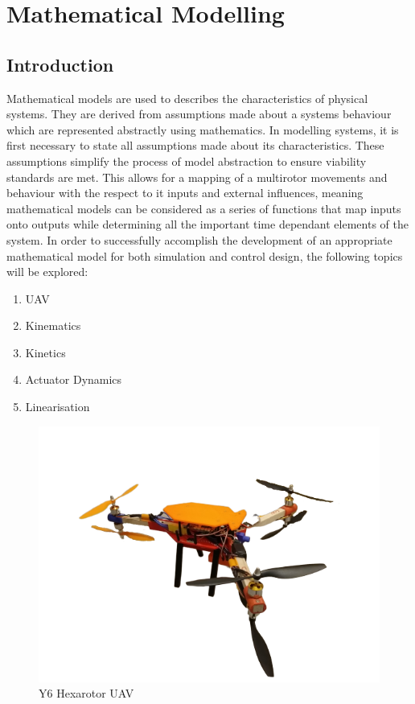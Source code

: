 \documentclass[12pt,a4paper,twoside]{report}
\begin{document}
		\newpage
			
	\chapter{Mathematical Modelling}
		
		\section{Introduction}
		
			Mathematical models are used to describes the characteristics of physical systems. They are derived from assumptions made about a systems behaviour which are represented abstractly using mathematics. In modelling systems, it is first necessary to state all assumptions made about its characteristics. These assumptions simplify the process of model abstraction to ensure viability standards are met. This allows for a mapping of a multirotor movements and behaviour with the respect to it inputs and external influences, meaning mathematical models can be considered as a series of functions that map inputs onto outputs while determining all the important time dependant elements of the system. In order to successfully accomplish the development of an appropriate mathematical model for both simulation and control design, the following topics will be explored:
			
			\begin{enumerate}
				\item
					UAV
				\item 
					Kinematics 
				\item 
					Kinetics
				\item 
					Actuator Dynamics
				\item 
					Linearisation
			\end{enumerate}
		
		\begin{figure}[h!]
			\centering
			\includegraphics[width=0.8\linewidth]{Y6UAV1-removebg-preview.png}
			\caption{Y6 Hexarotor UAV}
			\label{fig:Y6Hexarotor}
		\end{figure}
		\space
\end{document}
